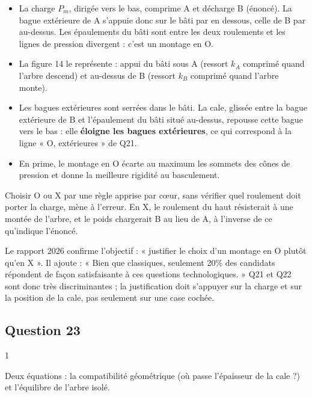 \documentclass[11pt,a4paper]{article}
\providecommand{\tightlist}{\setlength{\itemsep}{0pt}\setlength{\parskip}{0pt}}
\begin{document}
\begin{itemize}
\tightlist
\item
  La charge \(P_m\), dirigée vers le bas, comprime A et décharge B (énoncé). La bague extérieure de A s'appuie donc sur le bâti par en dessous, celle de B par au-dessus. Les épaulements du bâti sont entre les deux roulements et les lignes de pression divergent : c'est un montage en O.
\item
  La figure 14 le représente : appui du bâti sous A (ressort \(k_A\) comprimé quand l'arbre descend) et au-dessus de B (ressort \(k_B\) comprimé quand l'arbre monte).
\item
  Les bagues extérieures sont serrées dans le bâti. La cale, glissée entre la bague extérieure de B et l'épaulement du bâti situé au-dessus, repousse cette bague vers le bas : elle \textbf{éloigne les bagues extérieures}, ce qui correspond à la ligne « O, extérieures » de Q21.
\item
  En prime, le montage en O écarte au maximum les sommets des cônes de pression et donne la meilleure rigidité au basculement.
\end{itemize}

\begin{piege}

Choisir O ou X par une règle apprise par cœur, sans vérifier quel roulement doit porter la charge, mène à l'erreur. En X, le roulement du haut résisterait à une montée de l'arbre, et le poids chargerait B au lieu de A, à l'inverse de ce qu'indique l'énoncé.

\end{piege}

\begin{jury}

Le rapport 2026 confirme l'objectif : « justifier le choix d'un montage en O plutôt qu'en X ». Il ajoute : « Bien que classiques, seulement 20\% des candidats répondent de façon satisfaisante à ces questions technologiques. » Q21 et Q22 sont donc très discriminantes ; la justification doit s'appuyer sur la charge et sur la position de la cale, pas seulement sur une case cochée.

\end{jury}

\hypertarget{question-23}{%
\subsection{Question 23}\label{question-23}}

\begin{indication}{1}

Deux équations : la compatibilité géométrique (où passe l'épaisseur de la cale ?) et l'équilibre de l'arbre isolé.

\end{indication}
\end{document}
